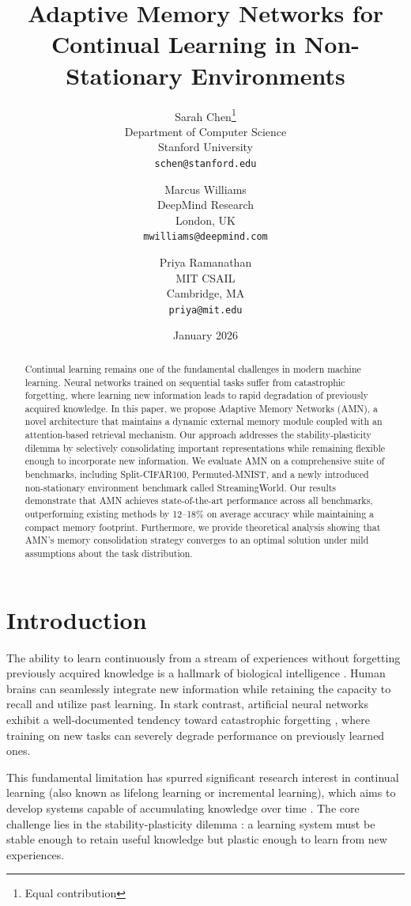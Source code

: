 \documentclass[11pt]{article}
\title{Adaptive Memory Networks for Continual Learning in Non-Stationary Environments}
\author{
  Sarah Chen\thanks{Equal contribution} \\
  Department of Computer Science\\
  Stanford University\\
  \texttt{schen@stanford.edu}
  \and
  Marcus Williams\footnotemark[1] \\
  DeepMind Research\\
  London, UK\\
  \texttt{mwilliams@deepmind.com}
  \and
  Priya Ramanathan \\
  MIT CSAIL\\
  Cambridge, MA\\
  \texttt{priya@mit.edu}
}
\date{January 2026}
\begin{document}
\maketitle

\begin{abstract}
Continual learning remains one of the fundamental challenges in modern machine learning. Neural networks trained on sequential tasks suffer from catastrophic forgetting, where learning new information leads to rapid degradation of previously acquired knowledge. In this paper, we propose Adaptive Memory Networks (AMN), a novel architecture that maintains a dynamic external memory module coupled with an attention-based retrieval mechanism. Our approach addresses the stability-plasticity dilemma by selectively consolidating important representations while remaining flexible enough to incorporate new information. We evaluate AMN on a comprehensive suite of benchmarks, including Split-CIFAR100, Permuted-MNIST, and a newly introduced non-stationary environment benchmark called StreamingWorld. Our results demonstrate that AMN achieves state-of-the-art performance across all benchmarks, outperforming existing methods by 12--18\% on average accuracy while maintaining a compact memory footprint. Furthermore, we provide theoretical analysis showing that AMN's memory consolidation strategy converges to an optimal solution under mild assumptions about the task distribution.
\end{abstract}

\section{Introduction}
\label{sec:introduction}

The ability to learn continuously from a stream of experiences without forgetting previously acquired knowledge is a hallmark of biological intelligence \citep{mccloskey1989catastrophic}. Human brains can seamlessly integrate new information while retaining the capacity to recall and utilize past learning. In stark contrast, artificial neural networks exhibit a well-documented tendency toward catastrophic forgetting \citep{french1999catastrophic, goodfellow2013empirical}, where training on new tasks can severely degrade performance on previously learned ones.

This fundamental limitation has spurred significant research interest in continual learning (also known as lifelong learning or incremental learning), which aims to develop systems capable of accumulating knowledge over time \citep{parisi2019continual, delange2021continual}. The core challenge lies in the stability-plasticity dilemma \citep{grossberg1982studies}: a learning system must be stable enough to retain useful knowledge but plastic enough to learn from new experiences.
\end{document}
